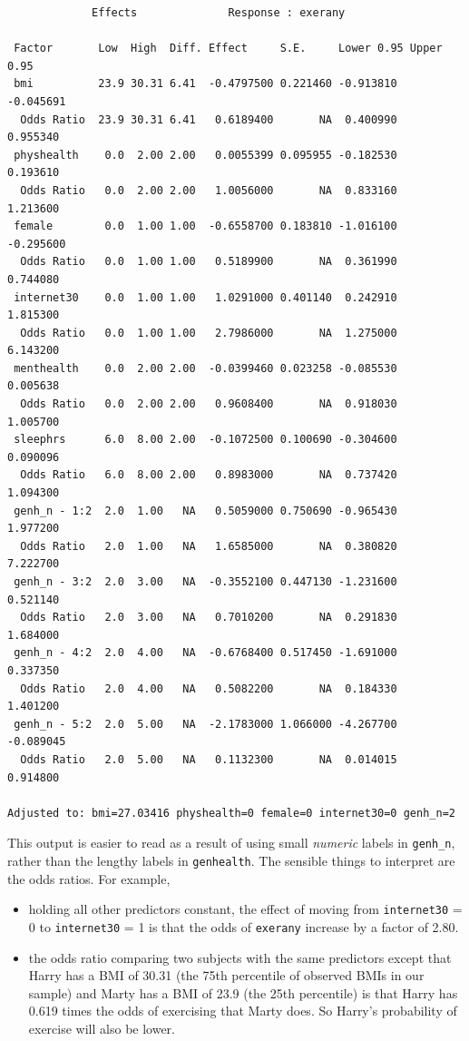 \documentclass[]{book}
\providecommand{\tightlist}{%
  \setlength{\itemsep}{0pt}\setlength{\parskip}{0pt}}
\theoremstyle{definition}
\theoremstyle{definition}
\theoremstyle{definition}
\theoremstyle{remark}
\begin{document}
\begin{verbatim}
             Effects              Response : exerany 

 Factor       Low  High  Diff. Effect     S.E.     Lower 0.95 Upper 0.95
 bmi          23.9 30.31 6.41  -0.4797500 0.221460 -0.913810  -0.045691 
  Odds Ratio  23.9 30.31 6.41   0.6189400       NA  0.400990   0.955340 
 physhealth    0.0  2.00 2.00   0.0055399 0.095955 -0.182530   0.193610 
  Odds Ratio   0.0  2.00 2.00   1.0056000       NA  0.833160   1.213600 
 female        0.0  1.00 1.00  -0.6558700 0.183810 -1.016100  -0.295600 
  Odds Ratio   0.0  1.00 1.00   0.5189900       NA  0.361990   0.744080 
 internet30    0.0  1.00 1.00   1.0291000 0.401140  0.242910   1.815300 
  Odds Ratio   0.0  1.00 1.00   2.7986000       NA  1.275000   6.143200 
 menthealth    0.0  2.00 2.00  -0.0399460 0.023258 -0.085530   0.005638 
  Odds Ratio   0.0  2.00 2.00   0.9608400       NA  0.918030   1.005700 
 sleephrs      6.0  8.00 2.00  -0.1072500 0.100690 -0.304600   0.090096 
  Odds Ratio   6.0  8.00 2.00   0.8983000       NA  0.737420   1.094300 
 genh_n - 1:2  2.0  1.00   NA   0.5059000 0.750690 -0.965430   1.977200 
  Odds Ratio   2.0  1.00   NA   1.6585000       NA  0.380820   7.222700 
 genh_n - 3:2  2.0  3.00   NA  -0.3552100 0.447130 -1.231600   0.521140 
  Odds Ratio   2.0  3.00   NA   0.7010200       NA  0.291830   1.684000 
 genh_n - 4:2  2.0  4.00   NA  -0.6768400 0.517450 -1.691000   0.337350 
  Odds Ratio   2.0  4.00   NA   0.5082200       NA  0.184330   1.401200 
 genh_n - 5:2  2.0  5.00   NA  -2.1783000 1.066000 -4.267700  -0.089045 
  Odds Ratio   2.0  5.00   NA   0.1132300       NA  0.014015   0.914800 

Adjusted to: bmi=27.03416 physhealth=0 female=0 internet30=0 genh_n=2  
\end{verbatim}

This output is easier to read as a result of using small \emph{numeric}
labels in \texttt{genh\_n}, rather than the lengthy labels in
\texttt{genhealth}. The sensible things to interpret are the odds
ratios. For example,

\begin{itemize}
\tightlist
\item
  holding all other predictors constant, the effect of moving from
  \texttt{internet30} = 0 to \texttt{internet30} = 1 is that the odds of
  \texttt{exerany} increase by a factor of 2.80.
\item
  the odds ratio comparing two subjects with the same predictors except
  that Harry has a BMI of 30.31 (the 75th percentile of observed BMIs in
  our sample) and Marty has a BMI of 23.9 (the 25th percentile) is that
  Harry has 0.619 times the odds of exercising that Marty does. So
  Harry's probability of exercise will also be lower.
\end{itemize}
\end{document}
